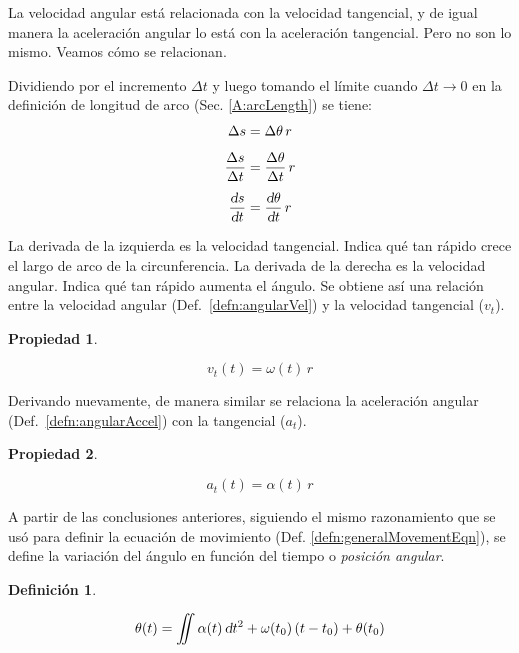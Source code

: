 \documentclass[a5paper,12pt,twoside]{book}
\newtheorem{defn}{{Definición}}[chapter]
\newtheorem{prop}{{Propiedad}}[chapter]
\begin{document}
La velocidad angular está relacionada con la velocidad tangencial, y de igual manera la aceleración angular lo está con la aceleración tangencial. Pero no son lo mismo. Veamos cómo se relacionan.

Dividiendo por el incremento $\Delta t$ y luego tomando el límite cuando $\Delta t \to 0$ en la definición de longitud de arco (Sec. \ref{A:arcLength}) se tiene:
\begin{align*}
    \Delta s &= \Delta \theta \, r
    \\[1ex]
    \frac{\Delta s}{\Delta t} &= \frac{\Delta \theta}{\Delta t} \, r
    \\[1ex]
    \frac{\textsl{d} s}{\textsl{d} t} &= \frac{\textsl{d} \theta}{\textsl{d} t} \, r
\end{align*}

La derivada de la izquierda es la velocidad tangencial. Indica qué tan rápido crece el largo de arco de la circunferencia. La derivada de la derecha es la velocidad angular. Indica qué tan rápido aumenta el ángulo. Se obtiene así una relación entre la velocidad angular (Def.\ \ref{defn:angularVel}) y la velocidad tangencial ($v_t$).

\begin{mdframed}[style=MyFrame1]
    \begin{prop}
        \label{prop:circularVel}
    \end{prop}
    \begin{equation*}
        v_t(t) = \omega(t) \, r
    \end{equation*}
\end{mdframed}

Derivando nuevamente, de manera similar se relaciona la aceleración angular (Def.\ \ref{defn:angularAccel}) con la tangencial ($a_t$).

\begin{mdframed}[style=MyFrame1]
    \begin{prop}
        \label{prop:circularAccel}
    \end{prop}
    \begin{equation*}
        a_t(t) = \alpha(t) \, r
    \end{equation*}
\end{mdframed}

A partir de las conclusiones anteriores, siguiendo el mismo razonamiento que se usó para definir la ecuación de movimiento (Def. \ref{defn:generalMovementEqn}), se define la variación del ángulo en función del tiempo o \emph{posición angular}.

\begin{mdframed}[style=MyFrame1]
    \begin{defn}
        \label{defn:anglePosition}
    \end{defn}
    \begin{equation*}
        \theta(t) = \iint \alpha(t) \, \textsl{d} t^2 + \omega (t_0) \left(t-t_0\right) + \theta(t_0)
    \end{equation*}
\end{mdframed}
\end{document}
